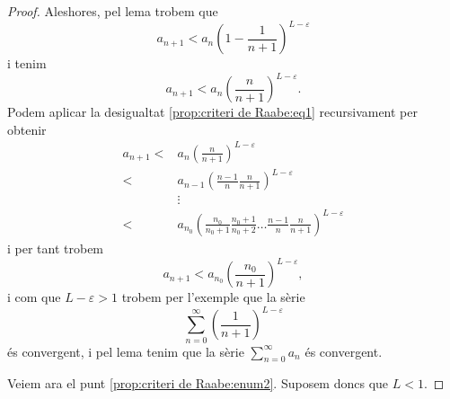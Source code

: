 \documentclass[../Apunts.tex]{subfiles}
\begin{document}
\begin{proposition}
\begin{proof}
			Aleshores, pel lema  trobem que
			\[a_{n+1}<a_{n}\left(1-\frac{1}{n+1}\right)^{L-\varepsilon}\]
			i tenim
			\begin{equation}
				\label{prop:criteri de Raabe:eq1}
				a_{n+1}<a_{n}\left(\frac{n}{n+1}\right)^{L-\varepsilon}.
			\end{equation}
			Podem aplicar la desigualtat \eqref{prop:criteri de Raabe:eq1} recursivament per obtenir
			\begin{align*}
				a_{n+1}<&a_{n}\left(\frac{n}{n+1}\right)^{L-\varepsilon}\\
				<&a_{n-1}\left(\frac{n-1}{n}\frac{n}{n+1}\right)^{L-\varepsilon}\\
				&\vdots\\
				<&a_{n_{0}}\left(\frac{n_{0}}{n_{0}+1}\frac{n_{0}+1}{n_{0}+2}\dots\frac{n-1}{n}\frac{n}{n+1}\right)^{L-\varepsilon}
			\end{align*}
			i per tant trobem
			\[a_{n+1}<a_{n_{0}}\left(\frac{n_{0}}{n+1}\right)^{L-\varepsilon},\]
			i com que \(L-\varepsilon>1\) trobem per l'exemple  que la sèrie
			\[\sum_{n=0}^{\infty}\left(\frac{1}{n+1}\right)^{L-\varepsilon}\]
			és convergent, i pel lema  tenim que la sèrie \(\sum_{n=0}^{\infty}a_{n}\) és convergent.
			
			Veiem ara el punt \eqref{prop:criteri de Raabe:enum2}. Suposem doncs que \(L<1\).
		\end{proof}
	\end{proposition}
\end{document}
